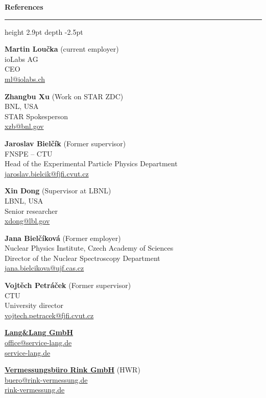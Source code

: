 \documentclass[a4paper,10pt,oneside]{article}
\newlength\cvhang
\newlength\cvfull
\newcommand\cvsmall{\sffamily\fontsize{9}{12.6}\selectfont}
\newcommand\cvsection[1]{\par\addvspace{20pt}\noindent\hspace*{-\cvhang}%
  {\sffamily\bfseries\fontsize{9}{11}\selectfont\color{accent}#1}%
  \enspace\textcolor{hair}{\leaders\hrule height 2.9pt depth -2.5pt\hfill}\par
  \nopagebreak\vspace{9pt}}
\newcommand\cvref[5]{\begin{minipage}[t]{.48\cvfull}\raggedright\cvsmall
  {\bfseries\fontsize{9.6}{12.6}\selectfont #1} {\color{meta}#2}\\
  #3\\#4\\\href{mailto:#5}{#5}\end{minipage}}
\newcommand\cvrefrow[2]{\par\noindent#1\hfill#2\par\vspace{10pt}}
\begin{document}
\cvsection{References}
\noindent\hspace*{-\cvhang}\begin{minipage}{\cvfull}
\cvrefrow{\cvref{Martin Loučka}{(current employer)}{ioLabs AG}{CEO}{ml@iolabs.ch}}
  {\cvref{Zhangbu Xu}{(Work on STAR ZDC)}{BNL, USA}{STAR Spokesperson}{xzb@bnl.gov}}
\cvrefrow{\cvref{Jaroslav Bielčík}{(Former supervisor)}{FNSPE -- CTU}{Head of the Experimental Particle Physics Department}{jaroslav.bielcik@fjfi.cvut.cz}}
  {\cvref{Xin Dong}{(Supervisor at LBNL)}{LBNL, USA}{Senior researcher}{xdong@lbl.gov}}
\cvrefrow{\cvref{Jana Bielčíková}{(Former employer)}{Nuclear Physics Institute, Czech Academy of Sciences}{Director of the Nuclear Spectroscopy Department}{jana.bielcikova@ujf.cas.cz}}
  {\cvref{Vojtěch Petráček}{(Former supervisor)}{CTU}{University director}{vojtech.petracek@fjfi.cvut.cz}}
\end{minipage}\par

\par\addvspace{3pt}\noindent{}\par\vspace{6pt}
\noindent\hspace*{-\cvhang}\begin{minipage}{\cvfull}\cvsmall
\begin{minipage}[t]{.48\linewidth}\raggedright
  \textbf{\href{https://www.service-lang.de/}{Lang\&Lang GmbH}}\\
  \href{mailto:office@service-lang.de}{office@service-lang.de}\\
  \href{https://www.service-lang.de/}{service-lang.de}
\end{minipage}\hfill
\begin{minipage}[t]{.48\linewidth}\raggedright
  \textbf{\href{https://rink-vermessung.de/}{Vermessungsbüro Rink GmbH}} {\color{meta}(HWR)}\\
  \href{mailto:buero@rink-vermessung.de}{buero@rink-vermessung.de}\\
  \href{https://rink-vermessung.de/}{rink-vermessung.de}
\end{minipage}
\end{minipage}
\end{document}
